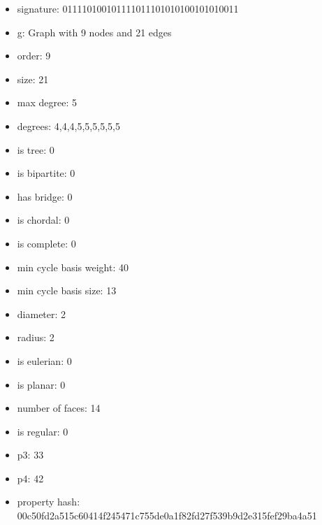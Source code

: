 \newpage
\begin{figure}
\end{figure}
\begin{itemize}
\item signature: 011110100101111011101010100101010011
\item g: Graph with 9 nodes and 21 edges
\item order: 9
\item size: 21
\item max degree: 5
\item degrees: 4,4,4,5,5,5,5,5,5
\item is tree: 0
\item is bipartite: 0
\item has bridge: 0
\item is chordal: 0
\item is complete: 0
\item min cycle basis weight: 40
\item min cycle basis size: 13
\item diameter: 2
\item radius: 2
\item is eulerian: 0
\item is planar: 0
\item number of faces: 14
\item is regular: 0
\item p3: 33
\item p4: 42
\item property hash: 00c50fd2a515c60414f245471c755de0a1f82fd27f539b9d2e315fef29ba4a51
\end{itemize}
